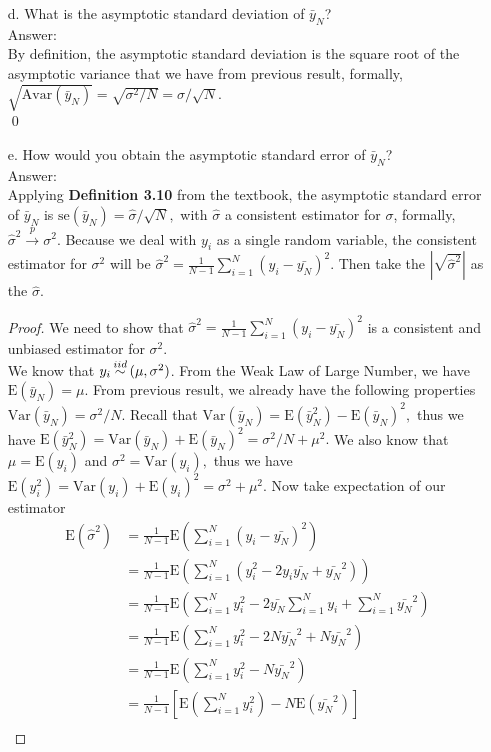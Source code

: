 \documentclass[10pt]{article}
\newcommand\iid{\stackrel{\mathclap{iid}}{\sim}}
\newcommand\convprob{\xrightarrow{p}}
\newcommand{\E}{\text{E}}
\newcommand{\V}{\text{Var}}
\newcommand{\Av}{\text{Avar}}
\newcommand{\se}{\text{se}}
\begin{document}
\begin{enumerate}
\item[d.] What is the asymptotic standard deviation of $\bar{y}_N$?
\\ Answer:\\
By definition, the asymptotic standard deviation is the square root of the asymptotic variance that we have from previous result, formally, $\sqrt{\Av(\bar{y}_N)}=\sqrt{\sigma^2/N}=\sigma/\sqrt{N}.$\\ \qed
\item[e.] How would you obtain the asymptotic standard error of $\bar{y}_N$?
\\ Answer:\\
Applying \textbf{Definition 3.10} from the textbook, the asymptotic standard error of $\bar{y}_N$ is $\se(\bar{y}_N)=\hat{\sigma}/\sqrt{N},$ with $\hat{\sigma}$ a consistent estimator for $\sigma$, formally, $\hat{\sigma}^2\convprob\sigma^2$. Because we deal with $y_i$ as a single random variable, the consistent estimator for $\sigma^2$ will be $\hat{\sigma}^2=\frac{1}{N-1}\sum_{i=1}^N (y_i-\bar{y_N})^2.$ Then take the $|\sqrt{\hat{\sigma}^2}|$ as the $\hat{\sigma}$.
\begin{proof}
We need to show that $\hat{\sigma}^2=\frac{1}{N-1}\sum_{i=1}^N (y_i-\bar{y_N})^2$ is a consistent and unbiased estimator for $\sigma^2$.\\
We know that $y_i\iid(\mu,\sigma^2)$. From the Weak Law of Large Number, we have $\E(\bar{y}_N)=\mu.$
From previous result, we already have the following properties $\V(\bar{y}_N) = \sigma^2/N.$ Recall that $\V(\bar{y}_N)=\E(\bar{y}_N^2)-\E(\bar{y}_N)^2,$ thus we have $\E(\bar{y}_N^2)=\V(\bar{y}_N)+\E(\bar{y}_N)^2=\sigma^2/N+\mu^2.$ We also know that $\mu=\E(y_i)$ and $\sigma^2=\V(y_i),$ thus we have $\E(y_i^2)=\V(y_i)+\E(y_i)^2=\sigma^2+\mu^2.$ Now take expectation of our estimator
\begin{align*}
    \E(\hat{\sigma}^2)&=\frac{1}{N-1}\E\left(\sum_{i=1}^N (y_i-\bar{y_N})^2\right)\\
    &=\frac{1}{N-1}\E\left(\sum_{i=1}^N (y_i^2-2y_i\bar{y_N}+\bar{y_N}^2)\right)\\
    &=\frac{1}{N-1}\E\left(\sum_{i=1}^N y_i^2-2\bar{y_N}\sum_{i=1}^Ny_i+\sum_{i=1}^N\bar{y_N}^2\right)\\
    &=\frac{1}{N-1}\E\left(\sum_{i=1}^N y_i^2-2N\bar{y_N}^2+N\bar{y_N}^2\right)\\
    &=\frac{1}{N-1}\E\left(\sum_{i=1}^N y_i^2-N\bar{y_N}^2\right)\\
    &=\frac{1}{N-1}\left[\E\left(\sum_{i=1}^N y_i^2\right)-N\E(\bar{y_N}^2)\right]\\

\end{align*}
\end{proof}
\end{enumerate}
\end{document}
